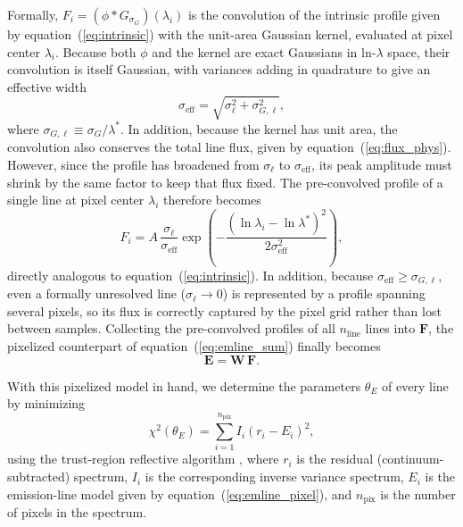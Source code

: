 \documentclass[modern,linenumbers]{aastex702}
\begin{document}
Formally, $F_i = (\phi * G_{\sigma_G})(\lambda_i)$ is the convolution
of the intrinsic profile given by equation~(\ref{eq:intrinsic}) with
the unit-area Gaussian kernel, evaluated at pixel center
$\lambda_i$. Because both $\phi$ and the kernel are exact Gaussians in
ln-$\lambda$ space, their convolution is itself Gaussian, with
variances adding in quadrature to give an effective width
\begin{equation}
  \sigma_\mathrm{eff} = \sqrt{\sigma_\ell^2 + \sigma_{G,\ell}^2},
  \label{eq:sigmaeff}
\end{equation}
\noindent where $\sigma_{G,\ell} \equiv \sigma_G/\lambda^*$. In
addition, because the kernel has unit area, the convolution also
conserves the total line flux, given by
equation~(\ref{eq:flux_phys}). However, since the profile has
broadened from $\sigma_\ell$ to $\sigma_\mathrm{eff}$, its peak
amplitude must shrink by the same factor to keep that flux fixed.  The
pre-convolved profile of a single line at pixel center $\lambda_i$
therefore becomes
\begin{equation}
  F_i = A\,\frac{\sigma_\ell}{\sigma_\mathrm{eff}}
    \exp\!\left(-\frac{(\ln\lambda_i-\ln\lambda^*)^2}{2\sigma_\mathrm{eff}^2}\right),
  \label{eq:model}
\end{equation}
directly analogous to equation~(\ref{eq:intrinsic}). In addition,
because $\sigma_\mathrm{eff} \geq \sigma_{G,\ell}$, even a formally
unresolved line ($\sigma_\ell \to 0$) is represented by a profile
spanning several pixels, so its flux is correctly captured by the
pixel grid rather than lost between samples. Collecting the
pre-convolved profiles of all $n_\mathrm{line}$ lines into
$\mathbf{F}$, the pixelized counterpart of
equation~(\ref{eq:emline_sum}) finally becomes
\begin{equation}
  \mathbf{E} = \mathbf{W}\,\mathbf{F}.
  \label{eq:emline_pixel}
\end{equation}

With this pixelized model in hand, we determine the parameters
$\theta_E$ of every line by minimizing
\begin{equation}
  \chi^2(\theta_E) = \sum_{i=1}^{n_\mathrm{pix}} I_i\left(r_i - E_i\right)^2,
  \label{eq:chi2line}
\end{equation}
using the trust-region reflective algorithm
\citep[\texttt{scipy.optimize.least\_squares};][]{branch99a}, where
$r_i$ is the residual (continuum-subtracted) spectrum, $I_i$ is the
corresponding inverse variance spectrum, $E_i$ is the emission-line
model given by equation~(\ref{eq:emline_pixel}), and $n_\mathrm{pix}$
is the number of pixels in the spectrum.
\end{document}
